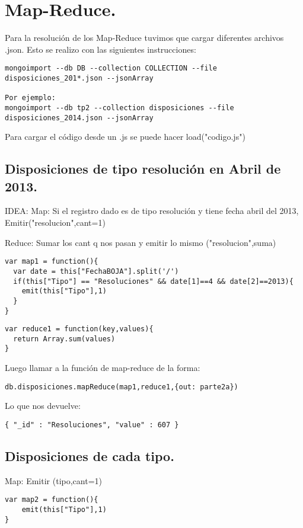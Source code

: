 \section{Map-Reduce.}
Para la resolución de los Map-Reduce tuvimos que cargar diferentes archivos .json. Esto se realizo con las siguientes instrucciones:
\begin{lstlisting}
mongoimport --db DB --collection COLLECTION --file 
disposiciones_201*.json --jsonArray

Por ejemplo:
mongoimport --db tp2 --collection disposiciones --file 
disposiciones_2014.json --jsonArray
\end{lstlisting}

Para cargar el código desde un .js se puede hacer load("codigo.js")

\subsection{Disposiciones de tipo resolución en Abril de 2013.}
IDEA:
Map:
Si el registro dado es de tipo resolución y tiene fecha abril del 2013, Emitir("resolucion",cant=1)

Reduce:
Sumar los cant q nos pasan y emitir lo mismo ("resolucion",suma)

\begin{lstlisting}
var map1 = function(){
  var date = this["FechaBOJA"].split('/')
  if(this["Tipo"] == "Resoluciones" && date[1]==4 && date[2]==2013){
    emit(this["Tipo"],1)
  }
}
\end{lstlisting}

\begin{lstlisting}
var reduce1 = function(key,values){
  return Array.sum(values)
}
\end{lstlisting}

Luego llamar a la función de map-reduce de la forma:
\begin{lstlisting}
db.disposiciones.mapReduce(map1,reduce1,{out: parte2a})
\end{lstlisting}

Lo que nos devuelve:

\begin{lstlisting}
{ "_id" : "Resoluciones", "value" : 607 }
\end{lstlisting}

\subsection{Disposiciones de cada tipo.}
Map:
Emitir (tipo,cant=1)
\begin{lstlisting}
var map2 = function(){
	emit(this["Tipo"],1)
}

\end{lstlisting}

